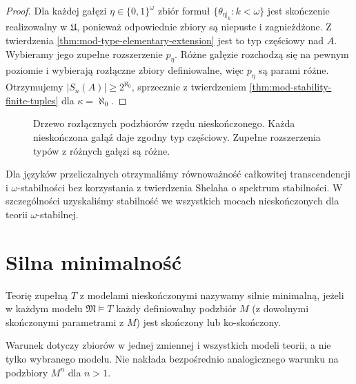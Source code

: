 \begin{proof}
Dla każdej gałęzi $\eta\in\{0,1\}^\omega$
zbiór formuł $\{\theta_{\eta|_k}:k<\omega\}$
jest skończenie realizowalny w $\mathfrak U$,
ponieważ odpowiednie zbiory są niepuste
i zagnieżdżone. Z twierdzenia
\ref{thm:mod-type-elementary-extension}
jest to typ częściowy nad $A$.
Wybieramy jego zupełne rozszerzenie $p_\eta$.
Różne gałęzie rozchodzą się na pewnym poziomie
i wybierają rozłączne zbiory definiowalne,
więc $p_\eta$ są parami różne.
Otrzymujemy $|S_n(A)|\geq2^{\aleph_0}$,
sprzecznie z twierdzeniem
\ref{thm:mod-stability-finite-tuples}
dla $\kappa=\aleph_0$.
\end{proof}

\begin{figure}[htbp]
\centering
{}
\caption{Drzewo rozłącznych podzbiorów rzędu nieskończonego.
Każda nieskończona gałąź daje zgodny typ częściowy.
Zupełne rozszerzenia typów z różnych gałęzi są różne.}
\label{fig:mod-morley-binary-tree}
\end{figure}

Dla języków przeliczalnych otrzymaliśmy
równoważność całkowitej transcendencji
i $\omega$-stabilności bez korzystania
z twierdzenia Shelaha o spektrum stabilności.
W szczególności uzyskaliśmy stabilność
we wszystkich mocach nieskończonych dla teorii
$\omega$-stabilnej.

\section{Silna minimalność}

\begin{definicja}
\label{def:mod-strong-minimality}
Teorię zupełną $T$ z modelami nieskończonymi
nazywamy silnie minimalną, jeżeli w każdym
modelu $\mathfrak M\models T$ każdy definiowalny
podzbiór $M$ (z dowolnymi skończonymi parametrami
z $M$) jest skończony lub ko-skończony.
\end{definicja}

Warunek dotyczy zbiorów w jednej zmiennej
i wszystkich modeli teorii, a nie tylko
wybranego modelu. Nie nakłada bezpośrednio
analogicznego warunku na podzbiory $M^n$
dla $n>1$.

